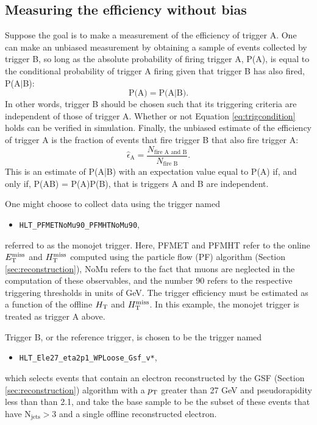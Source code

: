 \subsection{Measuring the efficiency without bias}
Suppose the goal is to make a measurement of the efficiency of trigger A. One can make an unbiased measurement by obtaining a sample of events collected by trigger B, so long as the absolute probability of firing trigger A, P(A), is equal to the conditional probability of trigger A firing given that trigger B has also fired, P(A$|$B):
\begin{equation}
\text{P(A)} = \text{P(A|B)}.
\label{eq:trigcondition}
\end{equation}
In other words, trigger B should be chosen such that its triggering criteria are independent of those of trigger A. Whether or not Equation \ref{eq:trigcondition} holds can be verified in simulation. Finally, the unbiased estimate of the efficiency of trigger A is the fraction of events that fire trigger B that also fire trigger A:
\begin{equation}
\hat{\epsilon}_{\text{A}} = \frac{N_{\text{fire A and B}}}{N_{\text{fire B}}}.
\label{eq:trigeff}
\end{equation}
This is an estimate of P(A|B) with an expectation value equal to P(A) if, and only if, P(AB) = P(A)P(B), that is triggers A and B are independent.

One might choose to collect data using the trigger named
\begin{itemize}
  \item \texttt{HLT\_PFMETNoMu90\_PFMHTNoMu90},
\end{itemize}
referred to as the monojet trigger. Here, PFMET and PFMHT refer to the online $E_{\text{T}}^{\rm miss}$ and $H_{\text{T}}^{\rm miss}$ computed using the particle flow (PF) algorithm (Section \ref{sec:reconstruction}), NoMu refers to the fact that muons are neglected in the computation of these observables, and the number 90 refers to the respective triggering thresholds in units of GeV. The trigger efficiency must be estimated as a function of the offline $H_{\rm T}$ and $H_{\text{T}}^{\rm miss}$. In this example, the monojet trigger is treated as trigger A above. 

Trigger B, or the reference trigger, is chosen to be the trigger named
\begin{itemize}
  \item \texttt{HLT\_Ele27\_eta2p1\_WPLoose\_Gsf\_v*}, 
\end{itemize}
which selects events that contain an electron reconstructed by the GSF (Section \ref{sec:reconstruction}) algorithm with a $p_{\text{T}}$ greater than 27 GeV and pseudorapidity less than than 2.1,
and take the base sample to be the subset of these events that have $\text{N}_{\text{jets}}>3$ and a single offline reconstructed electron.  

